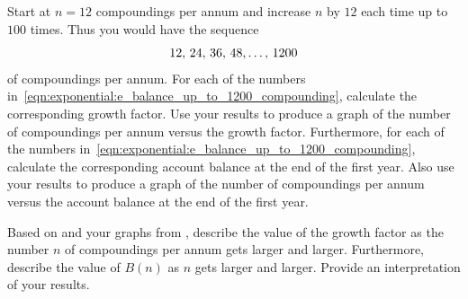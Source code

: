 \documentclass[a4paper,oneside,12pt]{article}
\begin{document}
\begin{problem}
\begin{packedenum}
  \item\label{subprob:exponential:e_balance_up_to_1200_compounding}
    Start at $n = 12$ compoundings per annum and increase $n$ by $12$
    each time up to $100$ times.  Thus you would have the sequence
    \begin{equation}
    \label{eqn:exponential:e_balance_up_to_1200_compounding}
    {{12},\,{24}},\, {{36},\, {48}}, \dots,\, {1200}
    \end{equation}
    of compoundings per annum.  For each of the numbers
    in~\eqref{eqn:exponential:e_balance_up_to_1200_compounding},
    calculate the corresponding growth factor.  Use your results to
    produce a graph of the number of compoundings per annum versus the
    growth factor.  Furthermore, for each of the numbers
    in~\eqref{eqn:exponential:e_balance_up_to_1200_compounding},
    calculate the corresponding account balance at the end of the
    first year.  Also use your results to produce a graph of the
    number of compoundings per annum versus the account balance at the
    end of the first year.

  \item\label{subprob:exponential:e_balance_limit_of_growth_factor_balance}
    Based on
     and
    your graphs
    from ,
    describe the value of the growth factor as the number $n$ of
    compoundings per annum gets larger and larger.  Furthermore,
    describe the value of $B(n)$ as $n$ gets larger and larger.
    Provide an interpretation of your results.


\end{packedenum}
\end{problem}
\end{document}
